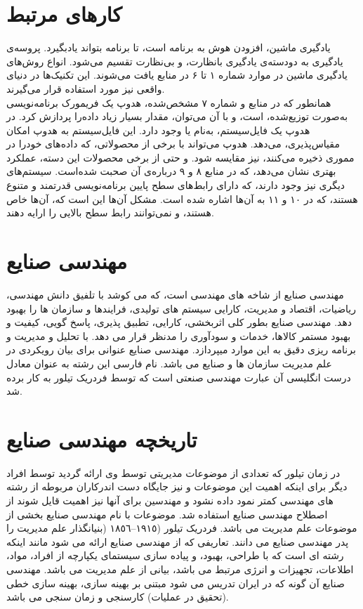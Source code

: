 \documentclass[12pt,onecolumn,a4paper]{article}
\begin{document}
\section{کارهای مرتبط}
یادگیری ماشین، افزودن هوش به برنامه است، تا برنامه بتواند یادبگیرد. پروسه‌ی یادگیری به دودسته‌ی یادگیری بانظارت، و بی‌نظارت تقسیم می‌شود. انواع روش‌های یادگیری ماشین در موارد شماره ۱ تا ۶ در منابع یافت می‌شوند.
این تکنیک‌ها در دنیای واقعی نیز مورد استفاده قرار می‌گیرند. \\
همانطور که در منابع و شماره ۷ مشخص‌شده، هدوپ یک فریمورک برنامه‌نویسی به‌صورت توزیع‌شده، است، و با آن می‌توان، مقدار بسیار زیاد داده‌را پردازش کرد.
در هدوپ یک فایل‌سیستم، به‌نام  یا  وجود دارد. این فایل‌سیستم به هدوپ امکان مقیاس‌پذیری، می‌دهد. هدوپ می‌تواند با برخی از محصولاتی، که داده‌های خودرا در مموری ذخیره می‌کنند، نیز مقایسه شود.
و حتی از برخی محصولات این دسته، عملکرد بهتری نشان می‌دهد، که در منابع ۸ و ۹ درباره‌ی آن صحبت شده‌است.
سیستم‌های دیگری نیز وجود دارند، که دارای رابط‌های سطح پایین برنامه‌نویسی قدرتمند و متنوع هستند، که در ۱۰ و ۱۱ به آن‌ها اشاره شده است.
مشکل آن‌ها این است که، آن‌ها خاص هستند، و نمی‌توانند رابط سطح بالایی را ارایه دهند.

\section{ مهندسی صنایع}
مهندسی صنایع   از شاخه های مهندسی است، که می کوشد با تلفیق دانش مهندسی، ریاضیات، اقتصاد و
مدیریت، کارایی سیستم های تولیدی، فرایندها و سازمان ها را بهبود دهد.
مهندسی صنایع بطور کلی اثربخشی، کارایی، تطبیق پذیری، پاسخ گویی، کیفیت و بهبود مستمر کالاها، خدمات و سودآوری را مدنظر قرار می دهد. با
تحلیل و مدیریت و برنامه ریزی دقیق به این موارد میپردازد.
مهندسی صنایع عنوانی برای بیان رویکردی در علم مدیریت سازمان ها و صنایع می باشد.
نام فارسی این رشته به عنوان معادل درست انگلیسی آن عبارت مهندسی صنعتی است که توسط فردریک تیلور به کار برده شد.

\section{تاریخچه مهندسی صنایع}
در زمان تیلور که تعدادی از موضوعات مدیریتی توسط وی ارائه گردید توسط افراد دیگر برای اینکه اهمیت این موضوعات و نیز جایگاه دست اندرکاران
مربوطه از رشته های مهندسی کمتر نمود داده نشود و مهندسین برای آنها نیز اهمیت قایل شوند از اصطلاح مهندسی صنایع استفاده شد. موضوعات با
نام مهندسی صنایع بخشی از موضوعات علم مدیریت می باشد. فردریک تیلور (١٩١٥–١٨٥٦ (بنیانگذار علم مدیریت را پدر مهندسی صنایع می دانند.
تعاریفی که از مهندسی صنایع ارائه می شود مانند اینکه رشته ای است که با طراحی، بهبود، و پیاده سازی سیستمای یکپارچه از افراد، مواد، اطلاعات،
تجهیزات و انرژی مرتبط می باشد، بیانی از علم مدیریت می باشد. مهندسی صنایع آن گونه که در ایران تدریس می شود مبتنی بر بهینه سازی،
بهینه سازی خطی (تحقیق در عملیات) کارسنجی و زمان سنجی می باشد.
\end{document}

